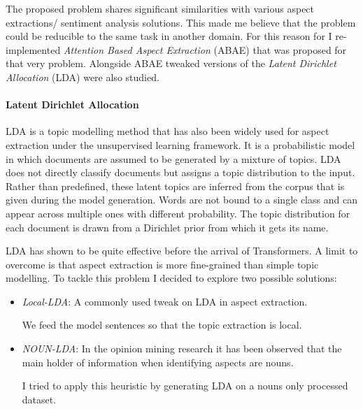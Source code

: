 The proposed problem shares significant similarities with various aspect extractions/ sentiment analysis solutions.
This made me believe that the problem could be reducible to the same task in another domain.
For this reason for I re-implemented \textit{Attention Based Aspect Extraction}  (ABAE)\cite{he-etal-2017-unsupervised}
that was proposed for that very problem.
Alongside ABAE tweaked versions of the \textit{Latent Dirichlet Allocation} (LDA) were also studied.

\paragraph{Latent Dirichlet Allocation}
LDA is a topic modelling method that has also been widely used for aspect extraction under the unsupervised learning framework.
It is a probabilistic model in which documents are assumed to be generated by a mixture of topics.
LDA does not directly classify documents but assigns a topic distribution to the input.
Rather than predefined, these latent topics are inferred from the corpus that is given during the model generation.
Words are not bound to a single class and can appear across multiple ones with different probability.
The topic distribution for each document is drawn from a Dirichlet prior from which it gets its name.

LDA has shown to be quite effective before the arrival of Transformers. A limit to overcome is that aspect extraction
is more fine-grained than simple topic modelling.
To tackle this problem I decided to explore two possible solutions:
\begin{itemize}
    \item{\textit{Local-LDA}}: A commonly used tweak on LDA in aspect extraction.

    We feed the model sentences so that the topic extraction is local.
    \item{\textit{NOUN-LDA}}: In the opinion mining research it has been observed that %
    the main holder of information when identifying aspects are nouns.

    I tried to apply this heuristic by generating LDA on a nouns only processed dataset.
\end{itemize}

